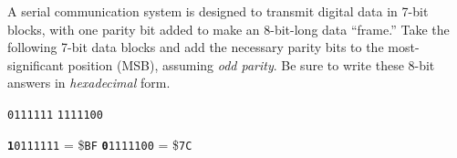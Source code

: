 

A serial communication system is designed to transmit digital data in 7-bit blocks, with one parity bit added to make an 8-bit-long data ``frame.''  Take the following 7-bit data blocks and add the necessary parity bits to the most-significant position (MSB), assuming {\it odd parity}.  Be sure to write these 8-bit answers in {\it hexadecimal} form.

\vskip 10pt

{\tt 0111111} \hskip 100pt {\tt 1111100}

\vskip 10pt







{\tt {\bf 1}0111111} = \${\tt BF}   \hskip 100pt {\tt {\bf 0}1111100} = \${\tt 7C}











